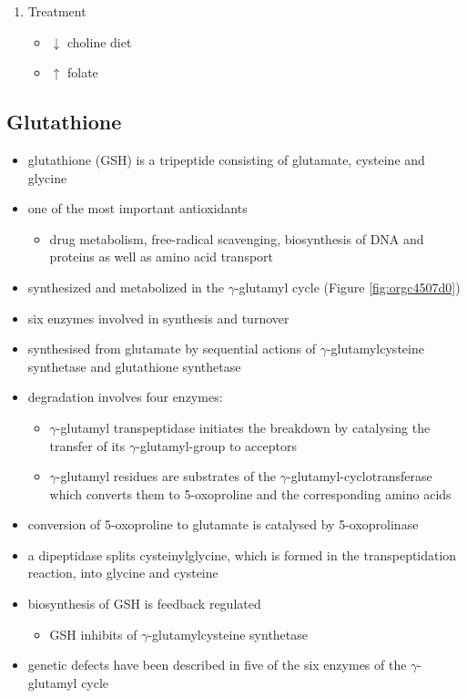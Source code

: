 \documentclass[12pt]{scrartcl}
\begin{document}
\begin{enumerate}
\item Treatment
\label{sec:org0c44f5b}
\begin{itemize}
\item \(\downarrow\) choline diet
\item \(\uparrow\) folate
\end{itemize}
\end{enumerate}

\subsection{Glutathione}
\label{sec:org3927d03}
\begin{itemize}
\item glutathione (GSH) is a tripeptide consisting of glutamate, cysteine and glycine
\item one of the most important antioxidants
\begin{itemize}
\item drug metabolism, free-radical scavenging, biosynthesis of DNA and
proteins as well as amino acid transport
\end{itemize}
\item synthesized and metabolized in the \(\gamma\)-glutamyl cycle (Figure
\ref{fig:orgc4507d0})
\item six enzymes involved in synthesis and turnover
\item synthesised from glutamate by sequential actions of
\(\gamma\)-glutamylcysteine synthetase and glutathione
synthetase
\item degradation involves four enzymes:
\begin{itemize}
\item \(\gamma\)-glutamyl transpeptidase initiates the breakdown by
catalysing the transfer of its \(\gamma\)-glutamyl-group to
acceptors
\item \(\gamma\)-glutamyl residues are substrates of the
\(\gamma\)-glutamyl-cyclotransferase which converts them to
5-oxoproline and the corresponding amino acids
\end{itemize}
\item conversion of 5-oxoproline to glutamate is catalysed by
5-oxoprolinase
\item a dipeptidase splits cysteinylglycine, which is formed in the
transpeptidation reaction, into glycine and cysteine
\item biosynthesis of GSH is feedback regulated
\begin{itemize}
\item GSH inhibits of \(\gamma\)-glutamylcysteine synthetase
\end{itemize}
\item genetic defects have been described in five of the six enzymes of
the \(\gamma\)-glutamyl cycle
\end{itemize}
\end{document}
